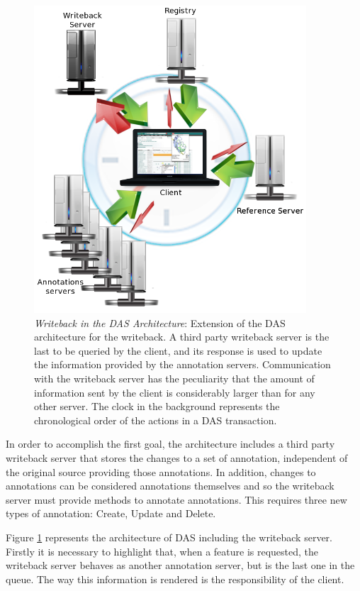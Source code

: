 \begin{figure}[ht] 
\centering
\includegraphics[width=4in]{figures/WritebackArchitecture.png} 
\caption[Writeback in the DAS Architecture]{\emph{Writeback in the DAS Architecture}: Extension of the DAS architecture for the writeback. A third party writeback server is the last to be queried by the client, and its response is used to update the information provided by the annotation servers. Communication with the writeback server has the peculiarity that the amount of information sent by the client is considerably larger than for any other server. The clock in the background represents the chronological order of the actions in a DAS transaction.}  \label{fig: WritebackArchitecture}
\end{figure}

In order to accomplish the first goal, the architecture includes a third party writeback server that stores the changes to a set of annotation, independent of the original source providing those annotations. In addition, changes to annotations can be considered annotations themselves and so the writeback server must provide methods to annotate annotations. This requires three new types of annotation: Create, Update and Delete.

Figure \ref{fig: WritebackArchitecture} represents the architecture of DAS including the writeback server. Firstly it is necessary to highlight that, when a feature is requested, the writeback server behaves as another annotation server, but is the last one in the queue. The way this information is rendered is the responsibility of the client. 

